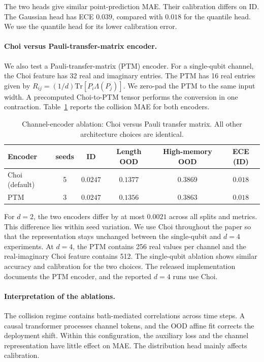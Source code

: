 \documentclass[10pt]{article}
\begin{document}
The two heads give similar point-prediction MAE. Their calibration differs on ID. The Gaussian head has ECE $0.039$, compared with $0.018$ for the quantile head. We use the quantile head for its lower calibration error.

\paragraph*{Choi versus Pauli-transfer-matrix encoder.}
We also test a Pauli-transfer-matrix (PTM) encoder. For a single-qubit channel, the Choi feature has 32 real and imaginary entries. The PTM has 16 real entries given by $R_{ij}=(1/d)\mathrm{Tr}[P_i\Lambda(P_j)]$. We zero-pad the PTM to the same input width. A precomputed Choi-to-PTM tensor performs the conversion in one contraction. Table~\ref{tab:supp_ablation_encoder} reports the collision MAE for both encoders.

\begin{table}[h]
\centering
\caption{Channel-encoder ablation: Choi versus Pauli transfer matrix. All other architecture choices are identical.}
\label{tab:supp_ablation_encoder}
\begin{tabular}{lccccc}
\toprule
Encoder & seeds & ID & Length OOD & High-memory OOD & ECE (ID) \\
\midrule
Choi (default) & 5 & $0.0247$ & $0.1377$ & $0.3869$ & $0.018$ \\
PTM & 3 & $0.0247$ & $0.1356$ & $0.3863$ & $0.018$ \\
\bottomrule
\end{tabular}
\end{table}

For $d=2$, the two encoders differ by at most $0.0021$ across all splits and metrics. This difference lies within seed variation. We use Choi throughout the paper so that the representation stays unchanged between the single-qubit and $d=4$ experiments. At $d=4$, the PTM contains 256 real values per channel and the real-imaginary Choi feature contains 512. The single-qubit ablation shows similar accuracy and calibration for the two choices. The released implementation documents the PTM encoder, and the reported $d=4$ runs use Choi.

\paragraph*{Interpretation of the ablations.}
The collision regime contains bath-mediated correlations across time steps. A causal transformer processes channel tokens, and the OOD affine fit corrects the deployment shift. Within this configuration, the auxiliary loss and the channel representation have little effect on MAE. The distribution head mainly affects calibration.
\end{document}

